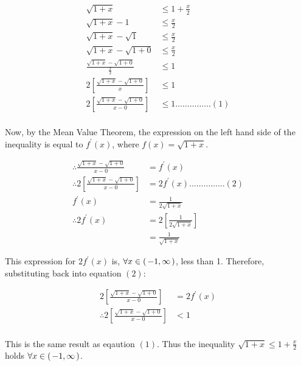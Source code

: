 		\begin{align*}
		\sqrt{1+x} & \leq 1 + \frac{x}{2}\\
		\sqrt{1+x} - 1 & \leq \frac{x}{2}\\
		\sqrt{1+x} - \sqrt{1} & \leq \frac{x}{2}\\
		\sqrt{1+x} - \sqrt{1+0} & \leq \frac{x}{2}\\
		\frac{\sqrt{1+x} - \sqrt{1+0}}{\frac{x}{2}} & \leq 1\\
		2\left[\frac{\sqrt{1+x} - \sqrt{1+0}}{x}\right] & \leq 1\\
		2\left[\frac{\sqrt{1+x} - \sqrt{1+0}}{x-0}\right] & \leq 1 \dots\dots\dots\dots\dots(1)\\
		\end{align*}

		Now, by the Mean Value Theorem, the expression on the left hand side of the inequality is equal to $f^\prime (x)$, where $f(x) = \sqrt{1+x}$.

		\begin{align*}
		\therefore \frac{\sqrt{1+x} - \sqrt{1+0}}{x-0} & = f^\prime (x)\\
		\therefore 2\left[\frac{\sqrt{1+x} - \sqrt{1+0}}{x-0}\right] & = 2f^\prime (x) \dots\dots\dots\dots\dots(2)\\
		f^\prime (x) & = \frac{1}{2\sqrt{1+x}}\\
		\therefore 2f^\prime (x) & = 2\left[\frac{1}{2\sqrt{1+x}}\right]\\
		& = \frac{1}{\sqrt{1+x}}
		\end{align*}

		\pagebreak

		This expression for $2f^\prime (x)$ is, $\forall x \in (\hspace{0.5mm} -1,\infty \hspace{0.5mm})$, less than 1. Therefore, substituting back into equation $(2)$:

		\begin{align*}
		2\left[\frac{\sqrt{1+x} - \sqrt{1+0}}{x-0}\right] & = 2f^\prime (x)\\
		\therefore 2\left[\frac{\sqrt{1+x} - \sqrt{1+0}}{x-0}\right] & < 1\\
		\end{align*}

		This is the same result as eqaution $(1)$. Thus the inequality $\sqrt{1+x} \leq 1 + \frac{x}{2}$ holds $\forall x \in (\hspace{0.5mm} -1,\infty \hspace{0.5mm})$.